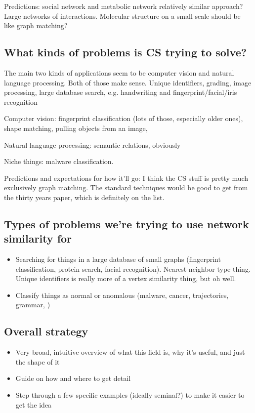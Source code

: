 \documentclass[12pt]{thesis}
\theoremstyle{plain}
\theoremstyle{definition}
\theoremstyle{remark}
\begin{document}
Predictions: social network and metabolic network relatively similar approach? Large networks of interactions. Molecular structure on a small scale should be like graph matching? 




\subsection{What kinds of problems is CS trying to solve?}

The main two kinds of applications seem to be computer vision and natural language processing. Both of those make sense. Unique identifiers, grading, image processing, large database search, e.g. handwriting and fingerprint/facial/iris recognition

Computer vision: fingerprint classification (lots of those, especially older ones), shape matching, pulling objects from an image, 

Natural language processing: semantic relations, obviously

Niche things: malware classification. 

Predictions and expectations for how it'll go: I think the CS stuff is pretty much exclusively graph matching. The standard techniques would be good to get from the thirty years paper, which is definitely on the list. 




\subsection{Types of problems we're trying to use network similarity for}

\begin{itemize}
\item Searching for things in a large database of small graphs (fingerprint classification, protein search, facial recognition). Nearest neighbor type thing. Unique identifiers is really more of a vertex similarity thing, but oh well.
\item Classify things as normal or anomalous (malware, cancer, trajectories, grammar, )
\end{itemize}




\subsection{Overall strategy}

\begin{itemize}
\item Very broad, intuitive overview of what this field is, why it's useful, and just the shape of it
\item Guide on how and where to get detail
\item Step through a few specific examples (ideally seminal?) to make it easier to get the idea
\end{itemize}
\end{document}
